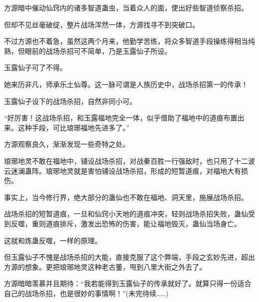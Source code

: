 \begin{this_body}
方源暗中催动仙窍内的诸多智道蛊虫，当着众人的面，使出好些智道侦察杀招。

但却不见丝毫破绽，整片战场浑然一体，方源找寻不到突破口。

不过方源也不着急，虽然这两个月来，他勤学苦练，将众多智道手段操练得相当纯熟，但眼前的战场杀招可不简单，乃是玉露仙子所设。

玉露仙子可了不得。

她来历非凡，师承乐土仙尊。这一脉可谓是人族历史中，战场杀招第一的传承！

玉露仙子设下的战场杀招，自然非同小可。

“好厉害！这战场杀招，和玉露福地完全一体，似乎借助了福地中的道痕布置出来。这种手段，可比琅琊福地先进多了。”

方源观察良久，渐渐发现一些奇特之处。

琅琊地灵不敢在福地中，铺设战场杀招，对战秦百胜一行强敌时，也只用了十二波云迷澜蛊阵。琅琊地灵就是害怕铺设战场杀招，形成的短暂道痕，对福地大有损伤。

事实上，当今修行界，绝大部分的蛊仙也不敢在福地、洞天里，施展战场杀招。

战场杀招的短暂道痕，一旦和仙窍小天地的道痕冲突，轻则战场杀招失败，蛊仙受到反噬，重则道痕排斥，激发出恐怖的伤害，能让福地毁灭，蛊仙当场身亡。

这就和炼蛊反噬，一样的原理。

但玉露仙子不愧是战场杀招的大能，直接克服了这个弊端，手段之玄妙先进，超出方源的想象。更把琅琊地灵这种老古董，甩到八里大街之外去了。

方源暗暗羡慕并且期待：“我若能得到玉露仙子的传承就好了。就算只得一份适合自己的战场杀招，也是很妙的事情啊！”(未完待续……)

\end{this_body}

